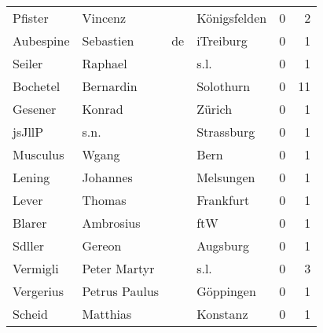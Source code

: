 \begin{center}
\begin{tiny}
\begin{longtabu}{llllrr}
                  Pfister &                            Vincenz &             &                                Königsfelden &          0 &         2 \\
                Aubespine &                          Sebastien &          de &                                   iTreiburg &          0 &         1 \\
                   Seiler &                            Raphael &             &                                        s.l. &          0 &         1 \\
                 Bochetel &                          Bernardin &             &                                   Solothurn &          0 &        11 \\
                  Gesener &                             Konrad &             &                                      Zürich &          0 &         1 \\
                   jsJllP &                               s.n. &             &                                  Strassburg &          0 &         1 \\
                 Musculus &                              Wgang &             &                                        Bern &          0 &         1 \\
                   Lening &                           Johannes &             &                                   Melsungen &          0 &         1 \\
                    Lever &                             Thomas &             &                                   Frankfurt &          0 &         1 \\
                   Blarer &                          Ambrosius &             &                                         ftW &          0 &         1 \\
                   Sdller &                             Gereon &             &                                    Augsburg &          0 &         1 \\
                 Vermigli &                       Peter Martyr &             &                                        s.l. &          0 &         3 \\
                Vergerius &                      Petrus Paulus &             &                                   Göppingen &          0 &         1 \\
                   Scheid &                           Matthias &             &                                    Konstanz &          0 &         1 \\

\end{longtabu}
\end{tiny}
\end{center}

